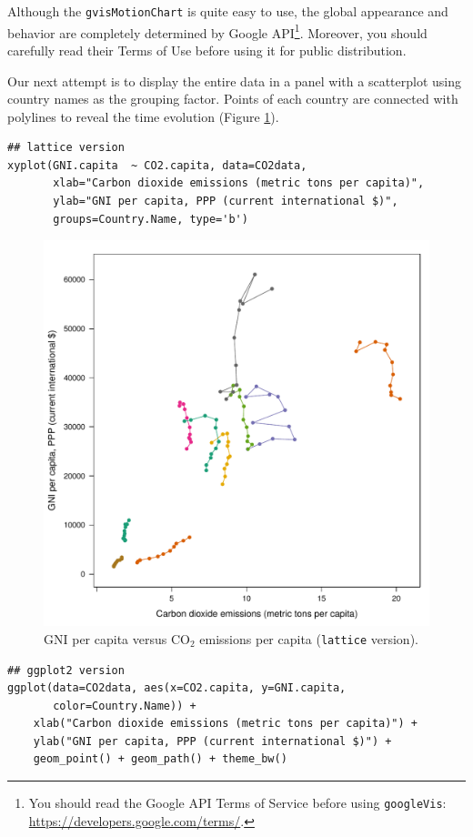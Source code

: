 Although the \texttt{gvisMotionChart} is quite easy to use, the global
appearance and behavior are completely determined by Google
API\footnote{You should read the Google API Terms of Service before using
  \texttt{googleVis}: \url{https://developers.google.com/terms/}.}. Moreover, you should carefully read their Terms of Use
before using it for public distribution.

Our next attempt is to display the entire data in a panel with a
scatterplot using country names as the grouping factor. Points of each
country are connected with polylines to reveal the time evolution
(Figure \ref{fig:CO2-GNI}).
\lstset{language=R,numbers=none}
\begin{lstlisting}
## lattice version
xyplot(GNI.capita  ~ CO2.capita, data=CO2data,
       xlab="Carbon dioxide emissions (metric tons per capita)",
       ylab="GNI per capita, PPP (current international $)",
       groups=Country.Name, type='b')
\end{lstlisting}

\begin{figure}[htb]
\centering
\includegraphics[width=.9\linewidth]{figs/CO2_GNI.pdf}
\caption{\label{fig:CO2-GNI}GNI per capita versus $\mathrm{CO_2}$ emissions per capita (\texttt{lattice} version).}
\end{figure}

\lstset{language=R,numbers=none}
\begin{lstlisting}
## ggplot2 version
ggplot(data=CO2data, aes(x=CO2.capita, y=GNI.capita,
	   color=Country.Name)) +
    xlab("Carbon dioxide emissions (metric tons per capita)") +
    ylab("GNI per capita, PPP (current international $)") +
    geom_point() + geom_path() + theme_bw()
\end{lstlisting}

